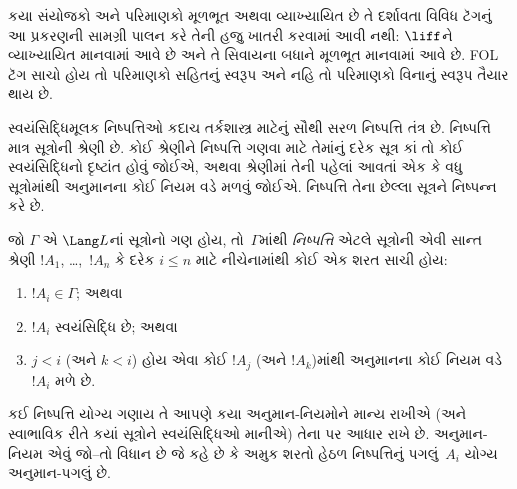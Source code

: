 \OLEndChapterHook
\endgroup


%
  \begingroup
\makeatletter{}\makeatother

\label{guunit:OLP-0112}

\begin{editorial}
  કયા સંયોજકો અને પરિમાણકો મૂળભૂત અથવા વ્યાખ્યાયિત છે તે દર્શાવતા
  વિવિધ ટૅગનું આ પ્રકરણની સામગ્રી પાલન કરે તેની હજુ ખાતરી કરવામાં
  આવી નથી: $\liff$ને વ્યાખ્યાયિત માનવામાં આવે છે અને તે સિવાયના બધાને
  મૂળભૂત માનવામાં આવે છે. FOL ટૅગ સાચો હોય તો પરિમાણકો સહિતનું સ્વરૂપ
  અને નહિ તો પરિમાણકો વિનાનું સ્વરૂપ તૈયાર થાય છે.
\end{editorial}

\begingroup
\makeatletter{}\makeatother


\label{guunit:OLP-0113}


\begin{explain}
  સ્વયંસિદ્ધિમૂલક નિષ્પત્તિઓ કદાચ તર્કશાસ્ત્ર માટેનું સૌથી સરળ
  નિષ્પત્તિ તંત્ર છે. નિષ્પત્તિ માત્ર સૂત્રોની શ્રેણી
  છે. કોઈ શ્રેણીને નિષ્પત્તિ ગણવા માટે તેમાંનું દરેક સૂત્ર
  કાં તો કોઈ સ્વયંસિદ્ધિનો દૃષ્ટાંત હોવું જોઈએ, અથવા શ્રેણીમાં તેની
  પહેલાં આવતાં એક કે વધુ સૂત્રોમાંથી અનુમાનના કોઈ નિયમ વડે
  મળવું જોઈએ. નિષ્પત્તિ તેના છેલ્લા સૂત્રને નિષ્પન્ન કરે છે.
\end{explain}

\begin{defn}[નિષ્પન્નક્ષમતા]
જો $\Gamma$ એ $\Lang L$નાં સૂત્રોનો ગણ હોય, તો~$\Gamma$માંથી
\emph{નિષ્પત્તિ} એટલે સૂત્રોની એવી સાન્ત શ્રેણી $!A_1$,
\dots,~$!A_n$ કે દરેક $i \le n$ માટે નીચેનામાંથી કોઈ એક શરત સાચી હોય:
\begin{enumerate}
\item $!A_i \in \Gamma$; અથવા
\item $!A_i$ સ્વયંસિદ્ધિ છે; અથવા
\item $j < i$ (અને $k < i$) હોય એવા કોઈ $!A_j$ (અને $!A_k$)માંથી
  અનુમાનના કોઈ નિયમ વડે $!A_i$ મળે છે.
\end{enumerate}
\end{defn}

કઈ નિષ્પત્તિ યોગ્ય ગણાય તે આપણે કયા અનુમાન-નિયમોને માન્ય રાખીએ
(અને સ્વાભાવિક રીતે કયાં સૂત્રોને સ્વયંસિદ્ધિઓ માનીએ) તેના પર આધાર રાખે
છે. અનુમાન-નિયમ એવું જો--તો વિધાન છે જે કહે છે કે અમુક શરતો હેઠળ
નિષ્પત્તિનું પગલું~$A_i$ યોગ્ય અનુમાન-પગલું છે.


